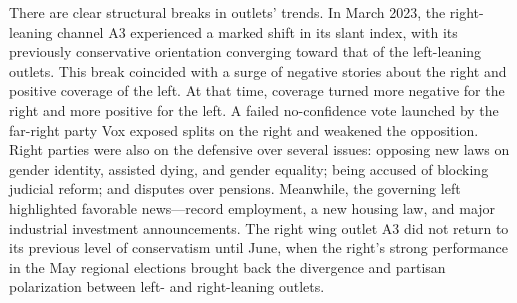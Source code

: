 \documentclass[12pt]{article}
\begin{document}


There are clear structural breaks in outlets’ trends. In March 2023, the right-leaning channel A3 experienced a marked shift in its slant index, with its previously conservative orientation converging toward that of the left-leaning outlets. This break coincided with a surge of negative stories about the right and positive coverage of the left. At that time, coverage turned more negative for the right and more positive for the left. A failed no-confidence vote launched by the far-right party Vox exposed splits on the right and weakened the opposition. Right parties were also on the defensive over several issues: opposing new laws on gender identity, assisted dying, and gender equality; being accused of blocking judicial reform; and disputes over pensions. Meanwhile, the governing left highlighted favorable news—record employment, a new housing law, and major industrial investment announcements. The right wing outlet A3 did not return to its previous level of conservatism until June, when the right’s strong performance in the May regional elections brought back the  divergence and partisan polarization between left- and right-leaning outlets. 
\end{document}
